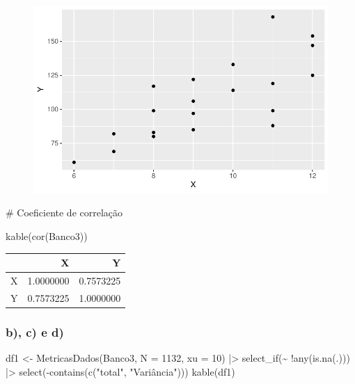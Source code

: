 \documentclass[
  letterpaper,
  DIV=11,
  numbers=noendperiod]{scrartcl}
\newenvironment{Shaded}{\begin{snugshade}}{\end{snugshade}}
\newcommand{\AttributeTok}[1]{\textcolor[rgb]{0.40,0.45,0.13}{#1}}
\newcommand{\CommentTok}[1]{\textcolor[rgb]{0.37,0.37,0.37}{#1}}
\newcommand{\DecValTok}[1]{\textcolor[rgb]{0.68,0.00,0.00}{#1}}
\newcommand{\FunctionTok}[1]{\textcolor[rgb]{0.28,0.35,0.67}{#1}}
\newcommand{\NormalTok}[1]{\textcolor[rgb]{0.00,0.23,0.31}{#1}}
\newcommand{\OtherTok}[1]{\textcolor[rgb]{0.00,0.23,0.31}{#1}}
\newcommand{\SpecialCharTok}[1]{\textcolor[rgb]{0.37,0.37,0.37}{#1}}
\newcommand{\StringTok}[1]{\textcolor[rgb]{0.13,0.47,0.30}{#1}}
\begin{document}
\begin{figure}[H]

{\centering \includegraphics{trabalho_amostragem_files/figure-pdf/unnamed-chunk-4-1.pdf}

}

\end{figure}

\begin{Shaded}
\begin{Highlighting}[]
\CommentTok{\# Coeficiente de correlação}

\FunctionTok{kable}\NormalTok{(}\FunctionTok{cor}\NormalTok{(Banco3))}
\end{Highlighting}
\end{Shaded}

\begin{longtable}[]{@{}lrr@{}}
\toprule()
& X & Y \\
\midrule()
\endhead
X & 1.0000000 & 0.7573225 \\
Y & 0.7573225 & 1.0000000 \\
\bottomrule()
\end{longtable}

\hypertarget{b-c-e-d}{%
\subsubsection{b), c) e d)}\label{b-c-e-d}}

\begin{Shaded}
\begin{Highlighting}[]
\NormalTok{df1 }\OtherTok{\textless{}{-}} \FunctionTok{MetricasDados}\NormalTok{(Banco3, }\AttributeTok{N =} \DecValTok{1132}\NormalTok{, }\AttributeTok{xu =} \DecValTok{10}\NormalTok{) }\SpecialCharTok{|\textgreater{}} 
  \FunctionTok{select\_if}\NormalTok{(}\SpecialCharTok{\textasciitilde{}} \SpecialCharTok{!}\FunctionTok{any}\NormalTok{(}\FunctionTok{is.na}\NormalTok{(.))) }\SpecialCharTok{|\textgreater{}}
  \FunctionTok{select}\NormalTok{(}\SpecialCharTok{{-}}\FunctionTok{contains}\NormalTok{(}\FunctionTok{c}\NormalTok{(}\StringTok{"total"}\NormalTok{, }\StringTok{"Variância"}\NormalTok{)))}
\FunctionTok{kable}\NormalTok{(df1)}
\end{Highlighting}
\end{Shaded}
\end{document}

